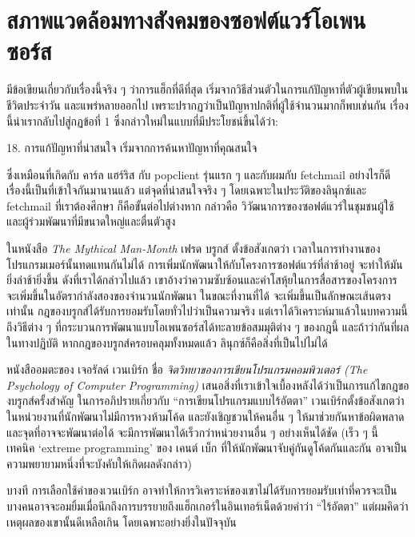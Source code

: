 \chapter{สภาพแวดล้อมทางสังคมของซอฟต์แวร์โอเพนซอร์ส}

มีข้อเขียนเกี่ยวกับเรื่องนี้จริง ๆ  ว่าการแฮ็กที่ดีที่สุด
เริ่มจากวิธีส่วนตัวในการแก้ปัญหาที่ตัวผู้เขียนพบในชีวิตประจำวัน
และแพร่หลายออกไป เพราะปรากฏว่าเป็นปัญหาปกติที่ผู้ใช้จำนวนมากก็พบเช่นกัน
เรื่องนี้นำเรากลับไปสู่กฏข้อที่ 1
ซึ่งกล่าวใหม่ในแบบที่มีประโยชน์ขึ้นได้ว่า:

\begin{fancyquotes}
  18. การแก้ปัญหาที่น่าสนใจ เริ่มจากการค้นหาปัญหาที่คุณสนใจ
\end{fancyquotes}

ซึ่งเหมือนที่เกิดกับ คาร์ล แฮร์ริส กับ popclient รุ่นแรก ๆ  และกับผมกับ
fetchmail อย่างไรก็ดี เรื่องนี้เป็นที่เข้าใจกันมานานแล้ว
แต่จุดที่น่าสนใจจริง ๆ  โดยเฉพาะในประวัติของลินุกซ์และ fetchmail
ที่เราต้องศึกษา ก็คือขั้นต่อไปต่างหาก กล่าวคือ
วิวัฒนาการของซอฟต์แวร์ในชุมชนผู้ใช้และผู้ร่วมพัฒนาที่มีขนาดใหญ่และตื่นตัวสูง

ในหนังสือ \emph{The Mythical Man-Month} เฟรด บรูกส์ ตั้งข้อสังเกตว่า
เวลาในการทำงานของโปรแกรมเมอร์นั้นทดแทนกันไม่ได้
การเพิ่มนักพัฒนาให้กับโครงการซอฟต์แวร์ที่ล่าช้าอยู่
จะทำให้มันยิ่งล่าช้ายิ่งขึ้น ดังที่เราได้กล่าวไปแล้ว
เขาอ้างว่าความซับซ้อนและค่าโสหุ้ยในการสื่อสารของโครงการ
จะเพิ่มขึ้นในอัตรากำลังสองของจำนวนนักพัฒนา ในขณะที่งานที่ได้
จะเพิ่มขึ้นเป็นลักษณะเส้นตรงเท่านั้น
กฎของบรูกส์ได้รับการยอมรับโดยทั่วไปว่าเป็นความจริง
แต่เราได้วิเคราะห์มาแล้วในบทความนี้ ถึงวิธีต่าง ๆ
ที่กระบวนการพัฒนาแบบโอเพนซอร์สได้ทะลายข้อสมมุติต่าง ๆ  ของกฎนี้
และถ้าว่ากันที่ผลในทางปฏิบัติ หากกฎของบรูกส์ครอบคลุมทั้งหมดแล้ว
ลินุกซ์ก็คือสิ่งที่เป็นไปไม่ได้

หนังสืออมตะของ เจอรัลด์ เวนเบิร์ก ชื่อ
\emph{จิตวิทยาของการเขียนโปรแกรมคอมพิวเตอร์ (The Psychology of Computer
  Programming)}
เสนอสิ่งที่เราเข้าใจเบื้องหลังได้ว่าเป็นการแก้ไขกฎของบรูกส์ครั้งสำคัญ
ในการอภิปรายเกี่ยวกับ ``การเขียนโปรแกรมแบบไร้อัตตา''
เวนเบิร์กตั้งข้อสังเกตว่า ในหน่วยงานที่นักพัฒนาไม่มีการหวงห้ามโค้ด
และยังเชิญชวนให้คนอื่น ๆ  ให้มาช่วยกันหาข้อผิดพลาด
และจุดที่อาจจะพัฒนาต่อได้ จะมีการพัฒนาได้เร็วกว่าหน่วยงานอื่น ๆ
อย่างเห็นได้ชัด (เร็ว ๆ  นี้ เทคนิค `extreme programming' ของ เคนต์ เบ็ก
ที่ให้นักพัฒนาจับคู่กันดูโค้ดกันและกัน
อาจเป็นความพยายามหนึ่งที่จะบังคับให้เกิดผลดังกล่าว)

บางที การเลือกใช้คำของเวนเบิร์ก
อาจทำให้การวิเคราะห์ของเขาไม่ได้รับการยอมรับเท่าที่ควรจะเป็น
บางคนอาจจะอมยิ้มเมื่อนึกถึงการบรรยายถึงแฮ็กเกอร์ในอินเทอร์เน็ตด้วยคำว่า
``ไร้อัตตา'' แต่ผมคิดว่าเหตุผลของเขานั้นดีเหลือเกิน
โดยเฉพาะอย่างยิ่งในปัจจุบัน

